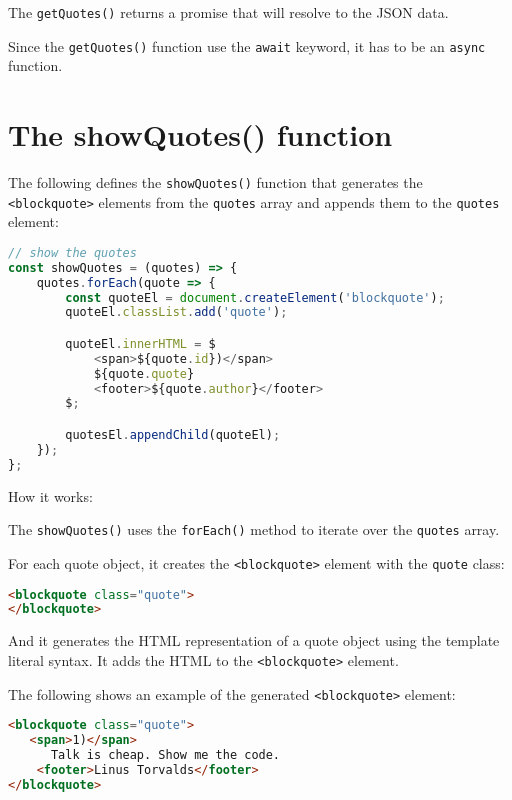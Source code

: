 \documentclass[11pt]{article}
\begin{document}
\noindent
The \verb|getQuotes()| returns a promise that will resolve to the JSON data.
\newline

\noindent
Since the \verb|getQuotes()| function use the \verb|await| keyword, it has to be
an \verb|async| function.

\section*{The showQuotes() function}

The following defines the \verb|showQuotes()| function that generates
the \verb|<blockquote>| elements from the \verb|quotes| array and appends them
to the \verb|quotes| element:
\newpage
\begin{lstlisting}[language=JavaScript]
// show the quotes
const showQuotes = (quotes) => {
    quotes.forEach(quote => {
        const quoteEl = document.createElement('blockquote');
        quoteEl.classList.add('quote');

        quoteEl.innerHTML = $
            <span>${quote.id})</span>
            ${quote.quote}
            <footer>${quote.author}</footer>
        $;

        quotesEl.appendChild(quoteEl);
    });
};
\end{lstlisting}

\noindent
How it works:
\newline

\noindent
The \verb|showQuotes()| uses the \verb|forEach()| method to iterate over
the \verb|quotes| array.
\newline

\noindent
For each quote object, it creates the \verb|<blockquote>| element with
the \verb|quote| class:

\begin{lstlisting}[language=HTML]
<blockquote class="quote">
</blockquote>
\end{lstlisting}

\noindent
And it generates the HTML representation of a quote object using
the template literal syntax. It adds the HTML to the \verb|<blockquote>| element.
\newline

\noindent
The following shows an example of the generated \verb|<blockquote>| element:

\begin{lstlisting}[language=HTML]
<blockquote class="quote">
   <span>1)</span>
      Talk is cheap. Show me the code.
    <footer>Linus Torvalds</footer>
</blockquote>
\end{lstlisting}
\end{document}
